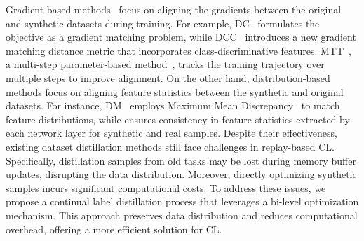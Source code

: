 \documentclass[table, xcdraw]{article}
\theoremstyle{plain}
\theoremstyle{definition}
\theoremstyle{remark}
\begin{document}
Gradient-based methods~\cite{DCzhao2020dataset, zhao2021dataset, lee2022dataset, jiang2023delving, kim2022dataset, zhang2023accelerating} focus on aligning the gradients between the original and synthetic datasets during training. For example, DC~\cite{DCzhao2020dataset} formulates the objective as a gradient matching problem, while DCC~\cite{lee2022dataset} introduces a new gradient matching distance metric that incorporates class-discriminative features. MTT~\cite{MTTcazenavette2022dataset}, a multi-step parameter-based method~\cite{li2024dataset, cui2023scaling}, tracks the training trajectory over multiple steps to improve alignment. On the other hand, distribution-based methods focus on aligning feature statistics between the synthetic and original datasets. For instance, DM~\cite{DMzhao2023dataset} employs Maximum Mean Discrepancy~\cite{mmdgretton2012kernel} to match feature distributions, while \cite{wang2022cafe} ensures consistency in feature statistics extracted by each network layer for synthetic and real samples. Despite their effectiveness, existing dataset distillation methods still face challenges in replay-based CL. Specifically, distillation samples from old tasks may be lost during memory buffer updates, disrupting the data distribution. Moreover, directly optimizing synthetic samples incurs significant computational costs. To address these issues, we propose a continual label distillation process that leverages a bi-level optimization mechanism. This approach preserves data distribution and reduces computational overhead, offering a more efficient solution for CL.
\end{document}
